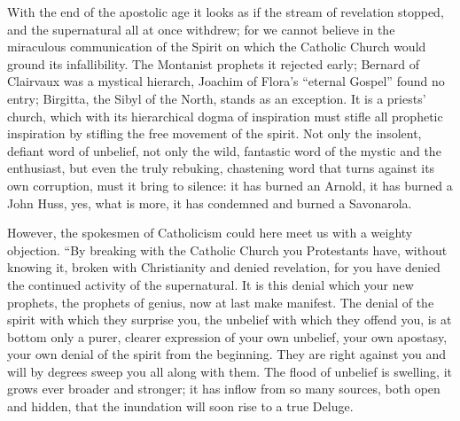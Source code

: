 \documentclass[12pt,a4paper,openany]{book}
\newcommand{\opage}[1]{\marginnote{\footnotesize\textit{[#1]}}}
\begin{document}
With the end of the apostolic age it looks as if
the stream of revelation stopped, and the supernatural
all at once withdrew; for we cannot believe in
the miraculous communication of the Spirit on which the Catholic
Church would ground its infallibility. The Montanist
prophets it rejected early; Bernard of Clairvaux
was a mystical hierarch, Joachim of Flora's ``eternal
Gospel'' found no entry; Birgitta, the Sibyl of the North,
stands as an exception. It is a
\setcounter{footnote}{0}%
\opage{62}priests' church, which with its hierarchical dogma of inspiration must
stifle all prophetic inspiration by stifling the
free movement of the spirit. Not only the insolent, defiant
word of unbelief, not only the wild, fantastic
word of the mystic and the enthusiast, but even the truly rebuking, chastening
word that turns against its own corruption, must
it bring to silence: it has burned an Arnold,
it has burned a John Huss, yes, what is more, it
has condemned and burned a Savonarola.

However, the spokesmen of Catholicism could here
meet us with a weighty objection. ``By breaking
with the Catholic Church you Protestants have, without
knowing it, broken with Christianity and denied
revelation, for you have denied the continued activity
of the supernatural. It is this denial which
your new prophets, the prophets of genius, now at last
make manifest. The denial of the spirit with which they surprise you, the unbelief with which they offend you, is
at bottom only a purer, clearer expression of your
own unbelief, your own apostasy, your own denial of the spirit
from the beginning. They are right against you
and will by degrees sweep you all along with them. The flood
of unbelief is swelling, it grows ever broader and
stronger; it has inflow from so many sources, both open
and hidden, that the inundation will soon
rise to a true Deluge.
\end{document}
